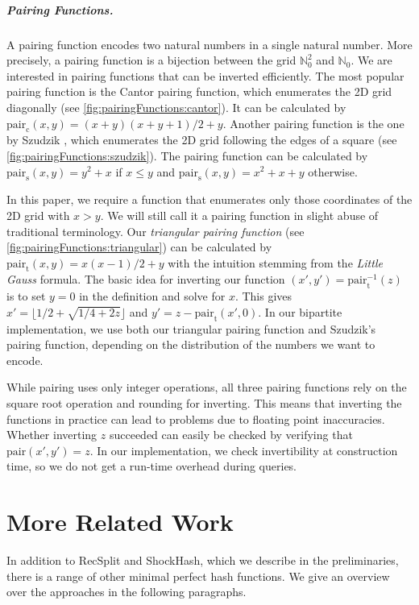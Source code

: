 \documentclass[a4paper,USenglish,cleveref]{lipics-v2021}
\newcommand{\myparagraph}[1]{\subparagraph*{#1}}
\begin{document}
\myparagraph{Pairing Functions.}\label{s:pairing}
A pairing function encodes two natural numbers in a single natural number.
More precisely, a pairing function is a bijection between the grid $\mathbb{N}_0^2$ and $\mathbb{N}_0$.
We are interested in pairing functions that can be inverted efficiently.
The most popular pairing function is the Cantor pairing function, which enumerates the 2D grid diagonally (see \cref{fig:pairingFunctions:cantor}).
It can be calculated by $\textrm{pair}_{\textrm{c}}(x, y) = (x + y)(x + y + 1)/2 + y$.
Another pairing function is the one by Szudzik \cite{szudzik2006elegant}, which enumerates the 2D grid following the edges of a square (see \cref{fig:pairingFunctions:szudzik}).
The pairing function can be calculated by $\textrm{pair}_{\textrm{s}}(x, y) = y^2+x$ if $x \leq y$ and $\textrm{pair}_{\textrm{s}}(x, y) = x^2+x+y$ otherwise.

In this paper, we require a function that enumerates only those coordinates of the 2D grid with $x > y$. We will still call it a pairing function in slight abuse of traditional terminology.
Our \emph{triangular pairing function} (see \cref{fig:pairingFunctions:triangular}) can be calculated by $\textrm{pair}_{\textrm{t}}(x, y) = x(x - 1)/2 + y$ with the intuition stemming from the \emph{Little Gauss} formula.
The basic idea for inverting our function $(x', y') = \textrm{pair}_{\textrm{t}}^{-1}(z)$ is to set $y=0$ in the definition and solve for $x$.
This gives $x'=\lfloor1/2 + \sqrt{1/4 + 2z}\rfloor$ and $y' = z - \textrm{pair}_{\textrm{t}}(x', 0)$.
In our bipartite implementation, we use both our triangular pairing function and Szudzik's pairing function, depending on the distribution of the numbers we want to encode.

While pairing uses only integer operations, all three pairing functions rely on the square root operation and rounding for inverting.
This means that inverting the functions in practice can lead to problems due to floating point inaccuracies.
Whether inverting $z$ succeeded can easily be checked by verifying that $\textrm{pair}(x', y') = z$.
In our implementation, we check invertibility at construction time, so we do not get a run-time overhead during queries.

\section{More Related Work}\label{s:related}
In addition to RecSplit and ShockHash, which we describe in the preliminaries, there is a range of other minimal perfect hash functions.
We give an overview over the approaches in the following paragraphs.
\end{document}
